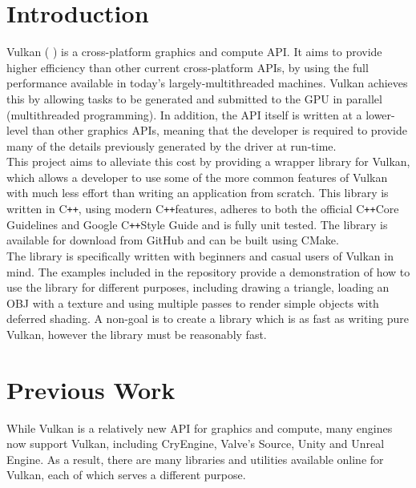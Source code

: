 \documentclass[12pt]{report}
\newcommand{\citesoftware}[1]{(\citeauthor{#1} \citeyear{#1})}
\newcommand{\cpp}{C\texttt{++}}
\theoremstyle{definition}
\begin{document}
  \tableofcontents

  \listoffigures

  \chapter{Introduction}
    Vulkan \citesoftware{vulkan} is a cross-platform graphics and compute API.
    It aims to provide higher efficiency than other current
    cross-platform APIs, by using the full performance available in today's
    largely-multithreaded machines. Vulkan achieves this by allowing tasks to be
    generated and submitted to the GPU in parallel (multithreaded programming).
    In addition, the API itself is written at a lower-level than other graphics
    APIs, meaning that the developer is required to provide many of the details
    previously generated by the driver at run-time.\\

    This project aims to alleviate this cost by providing a wrapper library for
    Vulkan, which allows a developer to use some of the more common features of
    Vulkan with much less effort than writing an application from scratch. This
    library is written in \cpp, using modern \cpp features, adheres to both the
    official \cpp Core Guidelines and Google \cpp Style Guide and is fully unit
    tested. The library is available for download from GitHub and can be built
    using CMake.\\

    The library is specifically written with beginners and casual users of
    Vulkan in mind. The examples included in the repository provide a
    demonstration of how to use the library for different purposes, including
    drawing a triangle, loading an OBJ with a texture and using multiple passes
    to render simple objects with deferred shading. A non-goal is to create a
    library which is as fast as writing pure Vulkan, however the library
    must be reasonably fast.\\

  \chapter{Previous Work}

    While Vulkan is a relatively new API for graphics and compute, many engines
    now support Vulkan, including CryEngine, Valve's Source, Unity and Unreal
    Engine. As a result, there are many libraries and utilities available
    online for Vulkan, each of which serves a different purpose.
\end{document}
